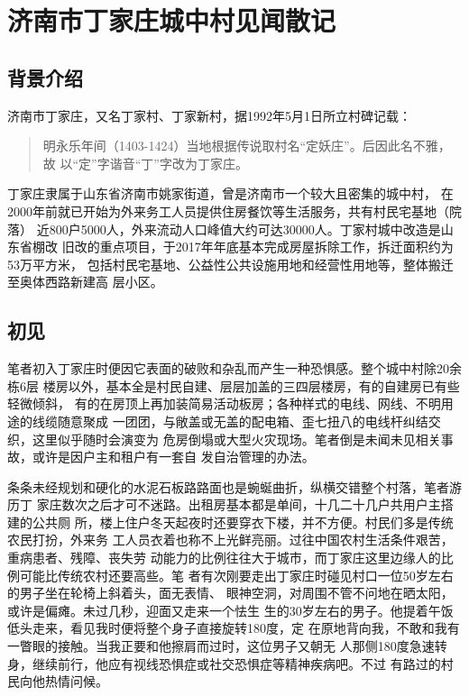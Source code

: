 \chapter{济南市丁家庄城中村见闻散记}

\section{背景介绍}

济南市丁家庄，又名丁家村、丁家新村，据1992年5月1日所立村碑记载：
\begin{quotation}
  明永乐年间（1403-1424）当地根据传说取村名“定妖庄”。后因此名不雅，故
  以“定”字谐音“丁”字改为丁家庄。
\end{quotation}

丁家庄隶属于山东省济南市姚家街道，曾是济南市一个较大且密集的城中村，
在2000年前就已开始为外来务工人员提供住房餐饮等生活服务，共有村民宅基地（院落）
近800户5000人，外来流动人口峰值大约可达30000人。丁家村城中改造是山东省棚改
旧改的重点项目，于2017年年底基本完成房屋拆除工作，拆迁面积约为53万平方米，
包括村民宅基地、公益性公共设施用地和经营性用地等，整体搬迁至奥体西路新建高
层小区。

\section{初见}

笔者初入丁家庄时便因它表面的破败和杂乱而产生一种恐惧感。整个城中村除20余栋6层
楼房以外，基本全是村民自建、层层加盖的三四层楼房，有的自建房已有些轻微倾斜，
有的在房顶上再加装简易活动板房；各种样式的电线、网线、不明用途的线缆随意聚成
一团团，与敞盖或无盖的配电箱、歪七扭八的电线杆纠结交织，这里似乎随时会演变为
危房倒塌或大型火灾现场。笔者倒是未闻未见相关事故，或许是因户主和租户有一套自
发自治管理的办法。

条条未经规划和硬化的水泥石板路路面也是蜿蜒曲折，纵横交错整个村落，笔者游历丁
家庄数次之后才可不迷路。出租房基本都是单间，十几二十几户共用户主搭建的公共厕
所，楼上住户冬天起夜时还要穿衣下楼，并不方便。村民们多是传统农民打扮，外来务
工人员衣着也称不上光鲜亮丽。过往中国农村生活条件艰苦，重病患者、残障、丧失劳
动能力的比例往往大于城市，而丁家庄这里边缘人的比例可能比传统农村还要高些。笔
者有次刚要走出丁家庄时碰见村口一位50岁左右的男子坐在轮椅上斜着头，面无表情、
眼神空洞，对周围不管不问地在晒太阳，或许是偏瘫。未过几秒，迎面又走来一个怯生
生的30岁左右的男子。他提着午饭低头走来，看见我时便将整个身子直接旋转180度，定
在原地背向我，不敢和我有一瞥眼的接触。当我正要和他擦肩而过时，这位男子又朝无
人那侧180度急速转身，继续前行，他应有视线恐惧症或社交恐惧症等精神疾病吧。不过
有路过的村民向他热情问候。


